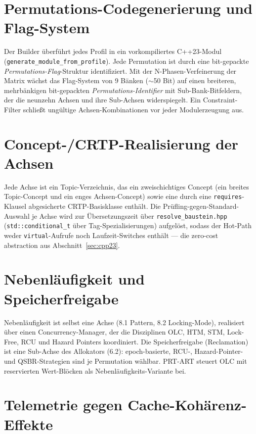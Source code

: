 \section{Permutations-Codegenerierung und Flag-System}\label{sec:codegen}

Der Builder überführt jedes Profil in ein vorkompiliertes C++23-Modul
(\texttt{generate\_\allowbreak{}module\_\allowbreak{}from\_\allowbreak{}profile}). Jede Permutation ist
durch eine bit-gepackte \emph{Permutations-Flag}-Struktur identifiziert. Mit der
N-Phasen-Verfeinerung der Matrix wächst das Flag-System von 9 Bänken ($\sim$50 Bit) auf einen
breiteren, mehrbänkigen bit-gepackten \emph{Permutations-Identifier} mit Sub-Bank-Bitfeldern, der
die neunzehn Achsen und ihre Sub-Achsen widerspiegelt. Ein Constraint-Filter schließt ungültige
Achsen-Kombinationen vor jeder Modulerzeugung aus.

\section{Concept-/CRTP-Realisierung der Achsen}\label{sec:concept-crtp}

Jede Achse ist ein Topic-Verzeichnis, das ein zweischichtiges Concept (ein breites Topic-Concept und
ein enges Achsen-Concept) sowie eine durch eine \texttt{requires}-Klausel abgesicherte
CRTP-Basisklasse enthält. Die Prüfling-gegen-Standard-Auswahl je Achse wird zur Übersetzungszeit
über \texttt{resolve\_baustein.hpp} (\texttt{std::conditional\_t} über Tag-Spezialisierungen)
aufgelöst, sodass der Hot-Path weder \texttt{virtual}-Aufrufe noch Laufzeit-Switches enthält --- die
zero-cost abstraction aus Abschnitt~\ref{sec:cpp23}.

\section{Nebenläufigkeit und Speicherfreigabe}\label{sec:concurrency}

Nebenläufigkeit ist selbst eine Achse (8.1 Pattern, 8.2 Locking-Mode), realisiert über einen
Concurrency-Manager, der die Disziplinen OLC, HTM, STM, Lock-Free, RCU und Hazard Pointers
koordiniert. Die Speicherfreigabe (Reclamation) ist eine Sub-Achse des Allokators (6.2):
epoch-basierte, RCU-, Hazard-Pointer- und QSBR-Strategien sind je Permutation wählbar. PRT-ART
steuert OLC mit reservierten Wert-Blöcken als Nebenläufigkeits-Variante bei.

\section{Telemetrie gegen Cache-Kohärenz-Effekte}\label{sec:telemetry}

